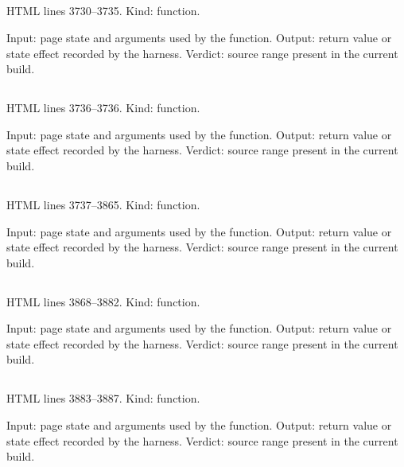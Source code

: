 \subsection*{\texttt{}}
\label{vf_130_isoLocal}
HTML lines 3730--3735. Kind: function.

Input: page state and arguments used by the function.
Output: return value or state effect recorded by the harness.
Verdict: source range present in the current build.

\subsection*{\texttt{}}
\label{vf_131_isEdsName}
HTML lines 3736--3736. Kind: function.

Input: page state and arguments used by the function.
Output: return value or state effect recorded by the harness.
Verdict: source range present in the current build.

\subsection*{\texttt{}}
\label{vf_132_decodeEds}
HTML lines 3737--3865. Kind: function.

Input: page state and arguments used by the function.
Output: return value or state effect recorded by the harness.
Verdict: source range present in the current build.

\subsection*{\texttt{}}
\label{vf_133_ixoIntegrity}
HTML lines 3868--3882. Kind: function.

Input: page state and arguments used by the function.
Output: return value or state effect recorded by the harness.
Verdict: source range present in the current build.

\subsection*{\texttt{}}
\label{vf_134_integrityLabel}
HTML lines 3883--3887. Kind: function.

Input: page state and arguments used by the function.
Output: return value or state effect recorded by the harness.
Verdict: source range present in the current build.

